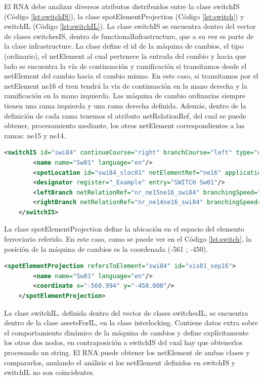     El RNA debe analizar diversos atributos distribuidos entre la clase switchIS (Código \ref{lst:switchIS}), la clase spotElementProjection (Código \ref{lst:switch}) y switchIL (Código \ref{lst:switchIL}). La clase switchIS se encuentra dentro del vector de clases switchesIS, dentro de functionalInfrastructure, que a su vez es parte de la clase infrastructure. La clase define el id de la máquina de cambios, el tipo (ordinario), el netElement al cual pertenece la entrada del cambio y hacia que lado se encuentra la vía de continuación y ramificación si transitamos desde el netElement del cambio hacia el cambio mismo. En este caso, si transitamos por el netElement ne16 el tren tendrá la vía de continuación en la mano derecha y la ramificación en la mano izquierda. Las máquina de cambio ordinarias siempre tienen una rama izquierda y una rama derecha definida. Además, dentro de la definición de cada rama tenemos el atributo netRelationRef, del cual se puede obtener, procesamiento mediante, los otros netElement correspondientes a las ramas: ne15 y ne14.

    \begin{lstlisting}[language = XML, caption = Clase switchIS , label = {lst:switchIS}]
    <switchIS id="swi84" continueCourse="right" branchCourse="left" type="ordinarySwitch">
        <name name="Sw01" language="en"/>
        <spotLocation id="swi84_sloc01" netElementRef="ne16" applicationDirection="reverse" intrinsicCoord="0.0000"/>
        <designator register="_Example" entry="SWITCH Sw01"/>
        <leftBranch netRelationRef="nr_ne15ne16_swi84" branchingSpeed="0" joiningSpeed="0" radius="-500"/>
        <rightBranch netRelationRef="nr_ne14ne16_swi84" branchingSpeed="0" joiningSpeed="0" radius="0"/>
    </switchIS>
    \end{lstlisting}

    La clase spotElementProjection define la ubicación en el espacio del elemento ferroviario referido. En este caso, como se puede ver en el Código \ref{lst:switch}, la posición de la máquina de cambios es la coordenada (-561 ; -450).

    \begin{lstlisting}[language = XML, caption = Clase spotElementProjection , label = {lst:switch}]
    <spotElementProjection refersToElement="swi84" id="vis01_sep16">
        <name name="Sw01" language="en"/>
        <coordinate x="-560.994" y="-450.000"/>
    </spotElementProjection>
    \end{lstlisting}

    La clase switchIL, definida dentro del vector de clases switchesIL, se encuentra dentro de la clase assetsForIL, en la clase interlocking. Contiene datos extra sobre el comportamiento dinámico de la máquina de cambios y define explícitamente los otros dos nodos, en contraposición a switchIS del cual hay que obtenerlos procesando un string. El RNA puede obtener los netElement de ambas clases y compararlos, anulando el análisis si los netElement definidos en switchIS y switchIL no son coincidentes.
    
